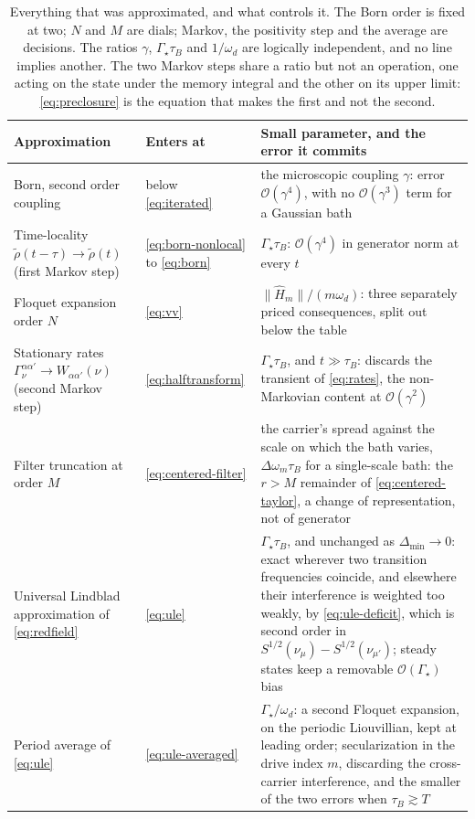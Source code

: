\documentclass[a4paper,11pt]{article}
\begin{document}
\begin{table}[H]
  \centering\small
  \renewcommand{\arraystretch}{1.7}
  \begin{tabular}{@{}L{4.6cm}L{3cm}L{7.4cm}@{}}
    \toprule
    Approximation & Enters at & Small parameter, and the error it commits \\
    \midrule
    Born, second order coupling
    & below \eqref{eq:iterated}
    & the microscopic coupling $\gamma$: error $\mathcal O(\gamma^4)$, with no $\mathcal O(\gamma^3)$ term for a Gaussian bath \\
    Time-locality $\tilde\rho(t-\tau)\to\tilde\rho(t)$ (first Markov step)
    & \eqref{eq:born-nonlocal} to \eqref{eq:born}
    & $\Gamma_{\!\star}\tau_B$: $\mathcal O(\gamma^4)$ in generator norm at every $t$ \\
    Floquet expansion order $N$
    & \eqref{eq:vv}
    & $\lVert\hat H_m\rVert/(m\omega_d)$: three separately priced consequences, split out below the table \\
    Stationary rates $\Gamma^{\alpha\alpha'}_\nu \to W_{\alpha\alpha'}(\nu)$ (second Markov step)
    & \eqref{eq:halftransform}
    & $\Gamma_{\!\star}\tau_B$, and $t\gg\tau_B$: discards the transient of \eqref{eq:rates}, the non-Markovian content at $\mathcal O(\gamma^2)$ \\
    Filter truncation at order $M$
    & \eqref{eq:centered-filter}
    & the carrier's spread against the scale on which the bath varies, $\Delta\omega_m\tau_B$ for a single-scale bath: the $r>M$ remainder of \eqref{eq:centered-taylor}, a change of representation, not of generator \\
    Universal Lindblad approximation of \eqref{eq:redfield}
    & \eqref{eq:ule}
    & $\Gamma_{\!\star}\tau_B$, and unchanged as $\Delta_{\min}\to0$: exact wherever two transition frequencies coincide, and elsewhere their interference is weighted too weakly, by \eqref{eq:ule-deficit}, which is second order in $S^{1/2}(\nu_\mu) - S^{1/2}(\nu_{\mu'})$; steady states keep a removable $\mathcal O(\Gamma_{\!\star})$ bias~\cite{Nathan2024Quantifying} \\
    Period average of \eqref{eq:ule}
    & \eqref{eq:ule-averaged}
    & $\Gamma_{\!\star}/\omega_d$: a second Floquet expansion, on the periodic Liouvillian, kept at leading order; secularization in the drive index $m$, discarding the cross-carrier interference, and the smaller of the two errors when $\tau_B\gtrsim T$ \\
    \bottomrule
  \end{tabular}
  \caption{Everything that was approximated, and what controls it. The Born order is fixed at two; $N$ and $M$ are dials; Markov, the positivity step and the average are decisions. The ratios $\gamma$, $\Gamma_{\!\star}\tau_B$ and $1/\omega_d$ are logically independent, and no line implies another. The two Markov steps share a ratio but not an operation, one acting on the state under the memory integral and the other on its upper limit: \cref{eq:preclosure} is the equation that makes the first and not the second.}
  \label{tab:ledger}
\end{table}
\end{document}
